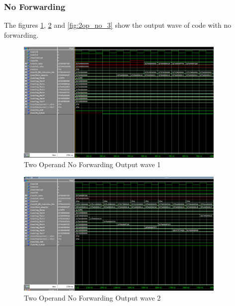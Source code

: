 \subsubsection{No Forwarding}
The figures \ref{fig:2op_no_1}, \ref{fig:2op_no_2} and \ref{fig:2op_no_3} show the output wave of code with no forwarding.
\begin{figure}[H]
    \centering
    \includegraphics[width=0.9\textwidth]{images/test_cases/two_operand/TwoOperand_no_forward_1.PNG}
    \caption{Two Operand No Forwarding Output wave 1}
    \label{fig:2op_no_1}
\end{figure}

\begin{figure}[H]
    \centering
    \includegraphics[width=0.9\textwidth]{images/test_cases/two_operand/TwoOperand_no_forward_2.PNG}
    \caption{Two Operand No Forwarding Output wave 2}
    \label{fig:2op_no_2}
\end{figure}

